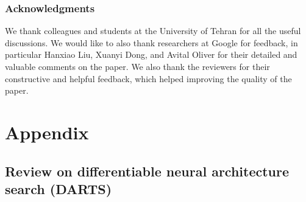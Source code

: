 \documentclass{article} \usepackage{fancyhdr, iclr2023_conference, times}
\begin{document}
\subsubsection*{Acknowledgments}
We thank colleagues and students at the University of Tehran for all the useful discussions. We would like to also thank researchers at Google for feedback, in particular Hanxiao Liu, Xuanyi Dong, and Avital Oliver for their detailed and valuable comments on the paper. We also thank the reviewers for their constructive and helpful feedback, which helped improving the quality of the paper.




\appendix
\section{Appendix}
\subsection{Review on differentiable neural architecture search (DARTS)}
\label{appndx:DARTS}
\end{document}
